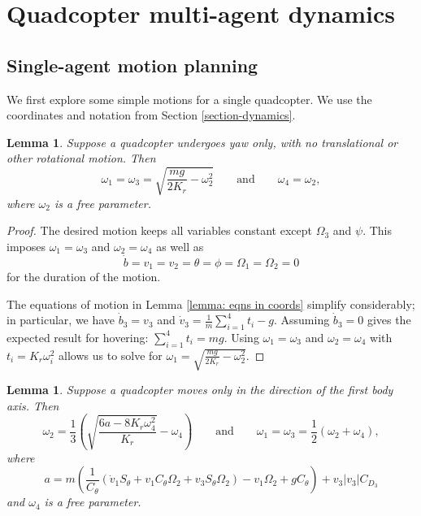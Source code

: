 \documentclass{aims}
\newtheorem{lemma}[theorem]{Lemma}
\theoremstyle{definition}
\begin{document}
\section{Quadcopter multi-agent dynamics}
\label{section-quadtrajectories}



\subsection{Single-agent motion planning}
\label{subsec: planning}
We first explore some simple motions for a single quadcopter.  We use the coordinates and notation from Section \ref{section-dynamics}.

 \begin{lemma}\label{lemma: yaw motion}
Suppose a quadcopter undergoes yaw only, with no translational or other rotational motion.  Then
\begin{equation*}
    \omega_1=\omega_3=\sqrt{\frac{mg}{2K_r}-\omega_2^2} \qquad \text{and} \qquad \omega_4=\omega_2,
\end{equation*}
where $\omega_2$ is a free parameter.
\end{lemma}

\begin{proof}
The desired motion keeps all variables constant except $\Omega_3$ and $\psi$.  This imposes $\omega_1=\omega_3$ and $\omega_2=\omega_4$ as well as 
$$\dot{b}= v_1 = v_2 = \theta = \phi = \Omega_1 = \Omega_2=0
$$
for the duration of the motion. 

The equations of motion in Lemma \ref{lemma: eqns in coords} simplify considerably; in particular, we have $\dot{b}_3=v_3$ and $\dot{v}_3=\frac{1}{m}\sum_{i=1}^4 t_i-g$.  Assuming $\dot{b}_3=0$ gives the expected result for hovering: $\sum_{i=1}^4 t_i=mg$.  Using $\omega_1=\omega_3$ and $\omega_2=\omega_4$ with $t_i=K_r\omega_i^2$ allows us to solve for 
$\omega_1=\sqrt{\frac{mg}{2K_r}-\omega_2^2}.$

\end{proof}

\begin{lemma}\label{lemma: x-axis motion}
Suppose a quadcopter moves only in the direction of the first body axis.  Then 
\begin{equation*}
    \omega_2=\frac{1}{3}\left(\sqrt{\frac{6a-8K_r\omega_4^2}{K_r}}-\omega_4\right) \qquad \text{and} \qquad \omega_1=\omega_3=\frac{1}{2}(\omega_2+\omega_4),
\end{equation*}
where 
$$a=m\left(\frac{1}{C_\theta}(\dot{v}_1S_\theta+v_1C_\theta\Omega_2+v_3S_\theta\Omega_2)-v_1\Omega_2+gC_\theta\right)+v_3|v_3|C_{D_3}
$$
and $\omega_4$ is a free parameter.  
\end{lemma}
\end{document}
